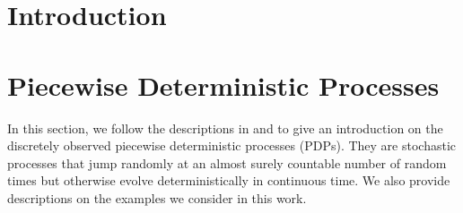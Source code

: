 \documentclass[12pt,a4paper]{article}
\begin{document}
\tableofcontents
\section{Introduction}
\section{Piecewise Deterministic Processes}\label{section: intro to PDMP}
In this section, we follow the descriptions in \cite{whiteley2011monte} and \cite{finke2014static} to give an introduction on the discretely observed piecewise deterministic processes (PDPs). They are stochastic processes that jump randomly at an almost surely countable number of random times but otherwise evolve deterministically in continuous time. We also provide descriptions on the examples we consider in this work. 
\end{document}
